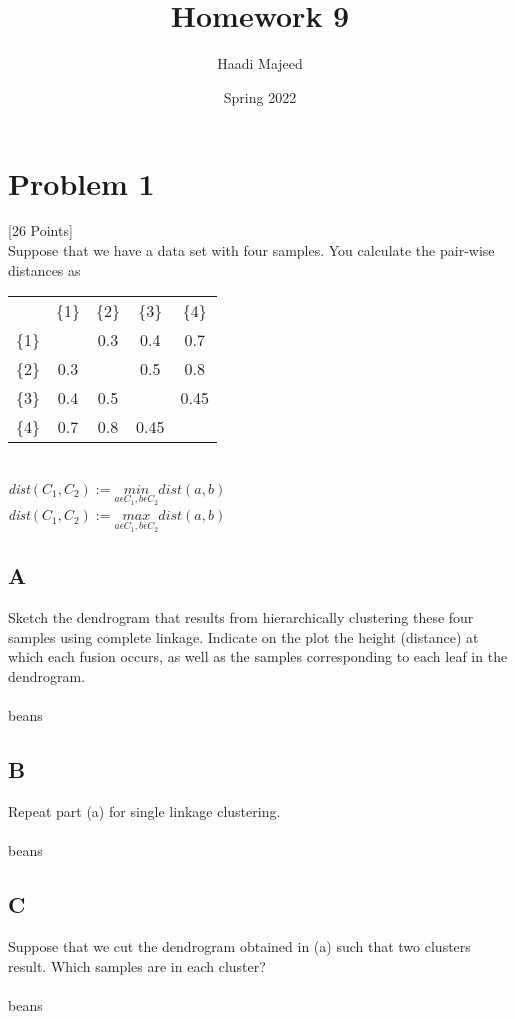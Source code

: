 \documentclass[12pt]{article}
\title{ \course \\\large Homework 9 }
\author{ Haadi Majeed }
\date{Spring 2022}
\begin{document}
\maketitle
\pagebreak

\pagebreak
\section{Problem 1}
 [26 Points]\\
Suppose that we have a data set with four samples. You calculate the pair-wise distances as\\
\begin{center}
    \begin{tabular}{c c c c c}
        {}    & \{1\} & \{2\} & \{3\} & \{4\} \\
        \{1\} &       & 0.3   & 0.4   & 0.7   \\
        \{2\} & 0.3   &       & 0.5   & 0.8   \\
        \{3\} & 0.4   & 0.5   &       & 0.45  \\
        \{4\} & 0.7   & 0.8   & 0.45  &
    \end{tabular}\\
    \emph{dist}$(C_1, C_2) := \underset{a\epsilon C_1, b\epsilon C_2}{min} dist(a,b)$\\
    \emph{dist}$(C_1, C_2) := \underset{a\epsilon C_1, b\epsilon C_2}{max} dist(a,b)$
\end{center}

\subsection{A}
Sketch the dendrogram that results from hierarchically clustering these four samples using complete linkage. Indicate on the plot the height (distance) at which each fusion occurs, as well as the samples corresponding to each leaf in the dendrogram.\\\\
beans


\subsection{B}
Repeat part (a) for single linkage clustering.\\\\
beans


\subsection{C}
Suppose that we cut the dendrogram obtained in (a) such that two clusters result. Which samples are in each cluster?\\\\
beans
\end{document}

